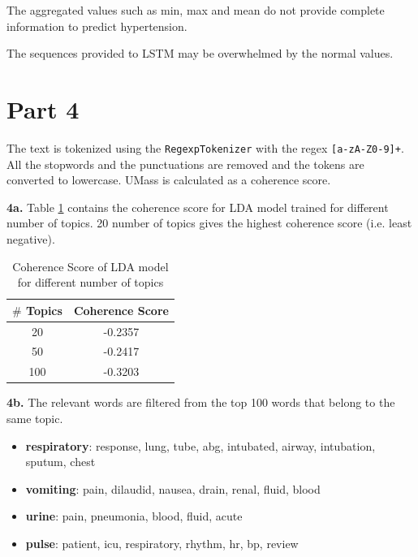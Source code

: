 \documentclass[]{article}
\begin{document}
The aggregated values such as min, max and mean do not provide complete information to predict hypertension. 

The sequences provided to LSTM may be overwhelmed by the normal values.

\section*{Part 4}
The text is tokenized using the \texttt{RegexpTokenizer} with the regex \texttt{[a-zA-Z0-9]+}. All the stopwords and the punctuations are removed and the tokens are converted to lowercase. UMass is calculated as a coherence score.

\textbf{4a.} Table \ref{tab:4a} contains the coherence score for LDA model trained for different number of topics. 20 number of topics gives the highest coherence score (i.e. least negative).

\begin{table}[h!]
	\centering
	\begin{tabular}{|c|c|}
		\hline
		\textbf{$\#$ Topics} & \textbf{Coherence Score}\\
		\hline
		20 & -0.2357\\
		50 & -0.2417\\
		100 & -0.3203\\
		\hline
	\end{tabular}
	\caption{Coherence Score of LDA model for different number of topics}
	\label{tab:4a}
\end{table}

\textbf{4b.} The relevant words are filtered from the top 100 words that belong to the same topic. 
\begin{itemize}
	\item \textbf{respiratory}: response, lung, tube, abg, intubated, airway, intubation, sputum, chest
	\item \textbf{vomiting}: pain, dilaudid, nausea, drain, renal, fluid, blood
	\item \textbf{urine}: pain, pneumonia, blood, fluid, acute
	\item \textbf{pulse}: patient, icu, respiratory, rhythm, hr, bp, review
\end{itemize}
\end{document}
